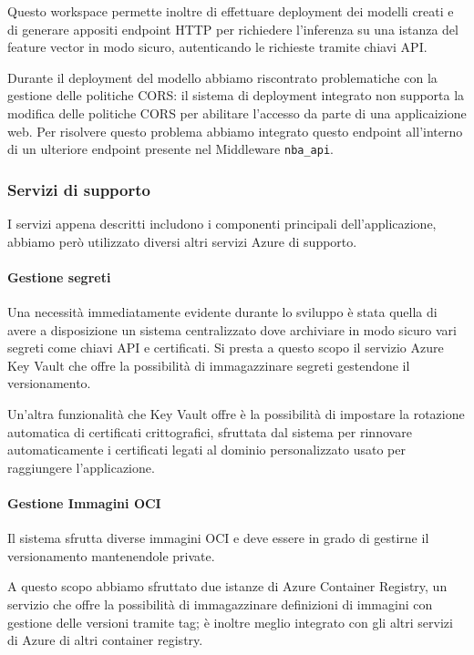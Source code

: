 Questo workspace permette inoltre di effettuare deployment dei modelli creati e di generare appositi endpoint HTTP per richiedere l'inferenza su una istanza del feature vector in modo sicuro, autenticando le richieste tramite chiavi API.

Durante il deployment del modello abbiamo riscontrato problematiche con la gestione delle politiche CORS: il sistema di deployment integrato non supporta la modifica delle politiche CORS per abilitare l'accesso da parte di una applicaizione web. Per risolvere questo problema abbiamo integrato questo endpoint all'interno di un ulteriore endpoint presente nel Middleware \texttt{nba\_api}.

\subsubsection{Servizi di supporto}
I servizi appena descritti includono i componenti principali dell'applicazione, abbiamo però utilizzato diversi altri servizi Azure di supporto.

\paragraph{Gestione segreti} 
Una necessità immediatamente evidente durante lo sviluppo è stata quella di avere a disposizione un sistema centralizzato dove archiviare in modo sicuro vari segreti come chiavi API e certificati. Si presta a questo scopo il servizio Azure Key Vault che offre la possibilità di immagazzinare segreti gestendone il versionamento.

Un'altra funzionalità che Key Vault offre è la possibilità di impostare la rotazione automatica di certificati crittografici, sfruttata dal sistema per rinnovare automaticamente i certificati legati al dominio personalizzato usato per raggiungere l'applicazione.

\paragraph{Gestione Immagini OCI}
Il sistema sfrutta diverse immagini OCI e deve essere in grado di gestirne il versionamento mantenendole private.

A questo scopo abbiamo sfruttato due istanze di Azure Container Registry, un servizio che offre la possibilità di immagazzinare definizioni di immagini con gestione delle versioni tramite tag; è inoltre meglio integrato con gli altri servizi di Azure di altri container registry.

